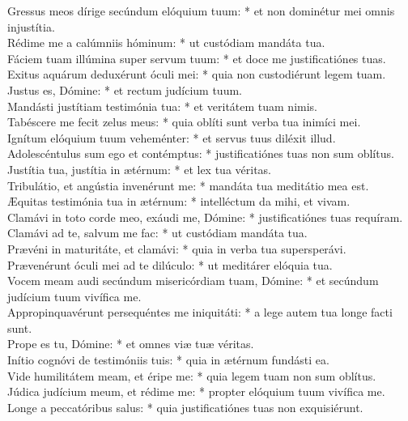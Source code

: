 {	Gressus meos dírige secúndum elóquium tuum: * et non dominétur mei omnis injustítia. \\
	Rédime me a calúmniis hóminum: * ut custódiam mandáta tua. \\
	Fáciem tuam illúmina super servum tuum: * et doce me justificatiónes tuas. \\
	Exitus aquárum deduxérunt óculi mei: * quia non custodiérunt legem tuam. \\
	Justus es, Dómine: * et rectum judícium tuum. \\
	Mandásti justítiam testimónia tua: * et veritátem tuam nimis. \\
	Tabéscere me fecit zelus meus: * quia oblíti sunt verba tua inimíci mei. \\
	Ignítum elóquium tuum veheménter: * et servus tuus diléxit illud. \\
	Adolescéntulus sum ego et contémptus: * justificatiónes tuas non sum oblítus. \\
	Justítia tua, justítia in ætérnum: * et lex tua véritas. \\
	Tribulátio, et angústia invenérunt me: * mandáta tua meditátio mea est. \\
	Æquitas testimónia tua in ætérnum: * intelléctum da mihi, et vivam. \\
	Clamávi in toto corde meo, exáudi me, Dómine: * justificatiónes tuas requíram. \\
	Clamávi ad te, salvum me fac: * ut custódiam mandáta tua. \\
	Prævéni in maturitáte, et clamávi: * quia in verba tua supersperávi. \\
	Prævenérunt óculi mei ad te dilúculo: * ut meditárer elóquia tua. \\
	Vocem meam audi secúndum misericórdiam tuam, Dómine: * et secúndum judícium tuum vivífica me. \\
	Appropinquavérunt persequéntes me iniquitáti: * a lege autem tua longe facti sunt. \\
	Prope es tu, Dómine: * et omnes viæ tuæ véritas. \\
	Inítio cognóvi de testimóniis tuis: * quia in ætérnum fundásti ea. \\
	Vide humilitátem meam, et éripe me: * quia legem tuam non sum oblítus. \\
	Júdica judícium meum, et rédime me: * propter elóquium tuum vivífica me. \\
	Longe a peccatóribus salus: * quia justificatiónes tuas non exquisiérunt. \\
}
